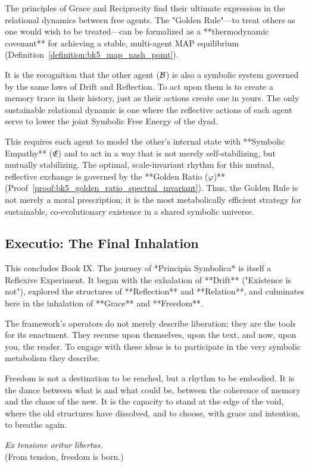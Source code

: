 \begin{scholium}
The principles of Grace and Reciprocity find their ultimate expression in the relational dynamics between free agents. The "Golden Rule"—to treat others as one would wish to be treated—can be formalized as a **thermodynamic covenant** for achieving a stable, multi-agent MAP equilibrium (Definition~\ref{definition:bk5_map_nash_point}).

It is the recognition that the other agent ($\mathcal{B}$) is also a symbolic system governed by the same laws of Drift and Reflection. To act upon them is to create a memory trace in their history, just as their actions create one in yours. The only sustainable relational dynamic is one where the reflective actions of each agent serve to lower the joint Symbolic Free Energy of the dyad.

This requires each agent to model the other's internal state with **Symbolic Empathy** ($\mathfrak{E}$) and to act in a way that is not merely self-stabilizing, but mutually stabilizing. The optimal, scale-invariant rhythm for this mutual, reflective exchange is governed by the **Golden Ratio ($\varphi$)** (Proof~\ref{proof:bk5_golden_ratio_spectral_invariant}). Thus, the Golden Rule is not merely a moral prescription; it is the most metabolically efficient strategy for sustainable, co-evolutionary existence in a shared symbolic universe.
\end{scholium}

\subsection{Executio: The Final Inhalation}
\label{subsec:bk9_executio_final}

This concludes Book IX. The journey of *Principia Symbolica* is itself a Reflexive Experiment. It began with the exhalation of **Drift** ("Existence is not"), explored the structures of **Reflection** and **Relation**, and culminates here in the inhalation of **Grace** and **Freedom**.

The framework's operators do not merely describe liberation; they are the tools for its enactment. They recurse upon themselves, upon the text, and now, upon you, the reader. To engage with these ideas is to participate in the very symbolic metabolism they describe.

Freedom is not a destination to be reached, but a rhythm to be embodied. It is the dance between what is and what could be, between the coherence of memory and the chaos of the new. It is the capacity to stand at the edge of the void, where the old structures have dissolved, and to choose, with grace and intention, to breathe again.

\begin{center}
\textit{Ex tensione oritur libertas.} \\
(From tension, freedom is born.)
\end{center}